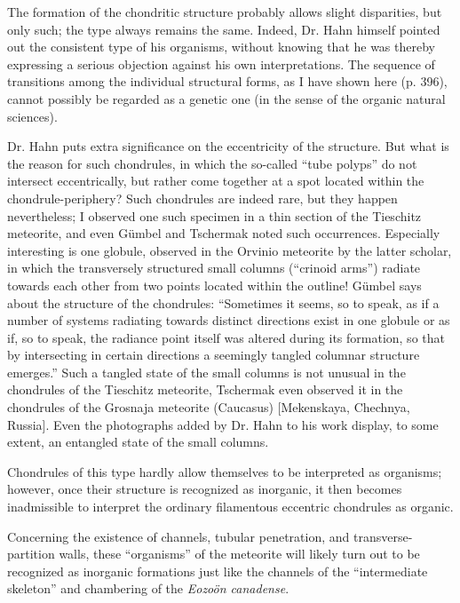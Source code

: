 \documentclass[a4paper, 12pt, oneside]{article}
\begin{document}
The formation of the chondritic structure probably allows slight disparities, but only such; the type always remains the same. Indeed, Dr. Hahn himself pointed out the consistent type of his organisms, without knowing that he was thereby expressing a serious objection against his own interpretations. The sequence of transitions among the individual structural forms, as I have shown here (p. 396), cannot possibly be regarded as a genetic one (in the sense of the organic natural sciences).

Dr. Hahn puts extra significance on the eccentricity of the structure. But what is the reason for such chondrules, in which the so-called ``tube polyps'' do not intersect eccentrically, but rather come together at a spot located within the chondrule-periphery? Such chondrules are indeed rare, but they happen nevertheless; I observed one such specimen in a thin section of the Tieschitz meteorite, and even Gümbel and Tschermak noted such occurrences. Especially interesting is one globule, observed in the Orvinio meteorite by the latter scholar, in which the transversely structured small columns (``crinoid arms'') radiate towards each other from two points located within the outline! Gümbel says about the structure of the chondrules: ``Sometimes it seems, so to speak, as if a number of systems radiating towards distinct directions exist in one globule or as if, so to speak, the radiance point itself was altered during its formation, so that by intersecting in certain directions a seemingly tangled columnar structure emerges.'' Such a tangled state of the small columns is not unusual in the chondrules of the Tieschitz meteorite, Tschermak even observed it in the chondrules of the Grosnaja meteorite (Caucasus) [Mekenskaya, Chechnya, Russia]. Even the photographs added by Dr. Hahn to his work display, to some extent, an entangled state of the small columns.

Chondrules of this type hardly allow themselves to be interpreted as organisms; however, once their structure is recognized as inorganic, it then becomes inadmissible to interpret the ordinary filamentous eccentric chondrules as organic.

Concerning the existence of channels, tubular penetration, and transverse-partition walls, these ``organisms'' of the meteorite will likely turn out to be recognized as inorganic formations just like the channels of the ``intermediate skeleton'' and chambering of the \emph{Eozoön canadense}.
\end{document}

